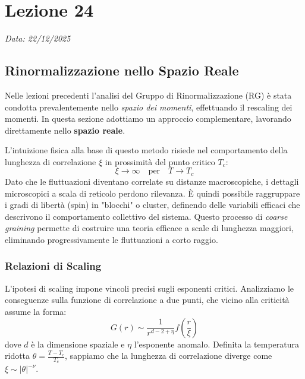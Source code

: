 \chapter{Lezione 24}
\label{chap:lezione_24}

\begin{flushright}
\textit{Data: 22/12/2025}
\end{flushright}


\section{Rinormalizzazione nello Spazio Reale}


Nelle lezioni precedenti l'analisi del Gruppo di Rinormalizzazione (RG) è stata condotta prevalentemente nello \textit{spazio dei momenti}, effettuando il rescaling dei momenti. 
In questa sezione adottiamo un approccio complementare, lavorando direttamente nello \textbf{spazio reale}. 

L'intuizione fisica alla base di questo metodo risiede nel comportamento della lunghezza di correlazione $\xi$ in prossimità del punto critico $T_c$:
\begin{equation}
    \xi \to \infty \quad \text{per} \quad T \to T_c
\end{equation}
Dato che le fluttuazioni diventano correlate su distanze macroscopiche, i dettagli microscopici a scala di reticolo perdono rilevanza. È quindi possibile raggruppare i gradi di libertà (spin) in "blocchi" o cluster, definendo delle variabili efficaci che descrivono il comportamento collettivo del sistema. Questo processo di \textit{coarse graining} permette di costruire una teoria efficace a scale di lunghezza maggiori, eliminando progressivamente le fluttuazioni a corto raggio.

\subsection{Relazioni di Scaling}


L'ipotesi di scaling impone vincoli precisi sugli esponenti critici. Analizziamo le conseguenze sulla funzione di correlazione a due punti, che vicino alla criticità assume la forma:
\begin{equation}
    G(r) \sim \frac{1}{r^{d-2+\eta}} f\left(\frac{r}{\xi}\right)
\end{equation}
dove $d$ è la dimensione spaziale e $\eta$ l'esponente anomalo. Definita la temperatura ridotta $\theta = \frac{T - T_c}{T_c}$, sappiamo che la  lunghezza di correlazione diverge come $\xi \sim |\theta|^{-\nu}$.

